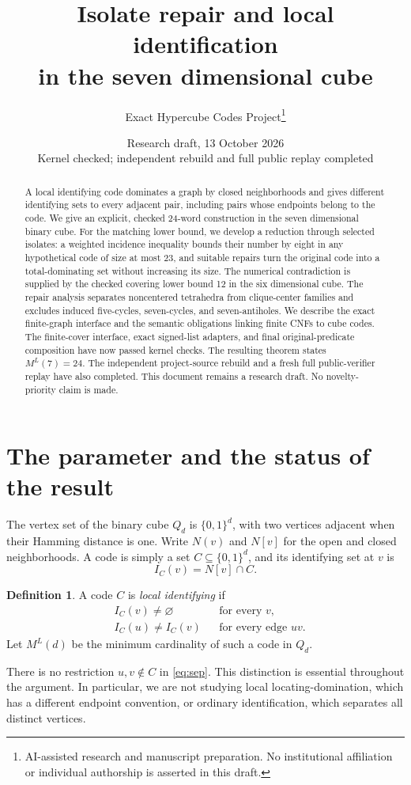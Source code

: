 \documentclass[11pt]{article}
\title{Isolate repair and local identification\protect\\in the seven dimensional cube}
\author{Exact Hypercube Codes Project\thanks{AI-assisted research and manuscript preparation. No institutional affiliation or individual authorship is asserted in this draft.}}
\date{Research draft, 13 October 2026\\\small Kernel checked; independent rebuild and full public replay completed}
\theoremstyle{definition}\newtheorem{definition}[theorem]{Definition}
\theoremstyle{remark}\newtheorem{remark}[theorem]{Remark}
\newcommand{\Q}{Q}
\newcommand{\bits}{\{0,1\}}
\begin{document}
\maketitle
\begin{abstract}
A local identifying code dominates a graph by closed neighborhoods and gives different identifying sets to every adjacent pair, including pairs whose endpoints belong to the code. We give an explicit, checked 24-word construction in the seven dimensional binary cube. For the matching lower bound, we develop a reduction through selected isolates: a weighted incidence inequality bounds their number by eight in any hypothetical code of size at most 23, and suitable repairs turn the original code into a total-dominating set without increasing its size. The numerical contradiction is supplied by the checked covering lower bound 12 in the six dimensional cube. The repair analysis separates noncentered tetrahedra from clique-center families and excludes induced five-cycles, seven-cycles, and seven-antiholes. We describe the exact finite-graph interface and the semantic obligations linking finite CNFs to cube codes. The finite-cover interface, exact signed-list adapters, and final original-predicate composition have now passed kernel checks. The resulting theorem states $M^L(7)=24$. The independent project-source rebuild and a fresh full public-verifier replay have also completed. This document remains a research draft. No novelty-priority claim is made.
\end{abstract}

\section{The parameter and the status of the result}
The vertex set of the binary cube $\Q_d$ is $\bits^d$, with two vertices adjacent when their Hamming distance is one. Write $N(v)$ and $N[v]$ for the open and closed neighborhoods. A code is simply a set $C\subseteq\bits^d$, and its identifying set at $v$ is
\[
 I_C(v)=N[v]\cap C.
\]
\begin{definition}
A code $C$ is \emph{local identifying} if
\begin{align}
 &I_C(v)\ne\varnothing &&\text{for every }v,\label{eq:dom}\\
 &I_C(u)\ne I_C(v) &&\text{for every edge }uv.\label{eq:sep}
\end{align}
Let $M^L(d)$ be the minimum cardinality of such a code in $\Q_d$.
\end{definition}
There is no restriction $u,v\notin C$ in \eqref{eq:sep}. This distinction is essential throughout the argument. In particular, we are not studying local locating-domination, which has a different endpoint convention, or ordinary identification, which separates all distinct vertices.
\end{document}
